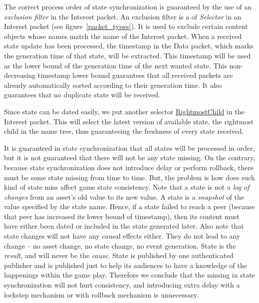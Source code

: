 \documentclass{sigchi}
\begin{document}
The correct process order of state synchronization is guaranteed by the use of an \emph{exclusion filter} in the Interest packet. An exclusion filter is a of \emph{Selector} in an Interest packet (see figure~\ref{packet_types}). It is used to exclude certain content objects whose names match the name of the Interest packet. When a received state update has been processed, the timestamp in the Data packet, which marks the generation time of that state, will be extracted. This timestamp will be used as the lower bound of the generation time of the next wanted state. This non-decreasing timestamp lower bound guarantees that all received packets are already automatically sorted according to their generation time. It also guarantees that no duplicate state will be received.

Since state can be dated easily, we put another selector \url{RightmostChild} in the Interest packet. This will select the latest version of available state, the rightmost child in the name tree, thus guaranteeing the freshness of every state received.

It is guaranteed in state synchronization that all states will be processed in order, but it is not guaranteed that there will not be any state missing. On the contrary, because state synchronization does not introduce delay or perform rollback, there must be some state missing from time to time. But, the problem is how does such kind of state miss affect game state consistency. Note that a state is not a \emph{log of changes} from an asset's old value to its new value. A state is a \emph{snapshot} of the value specified by the state name. Hence, if a state failed to reach a peer (because that peer has increased its lower bound of timestamp), then its content must have either been dated or included in the state generated later. Also note that state changes will not have any causal effects either. They do not lead to any change -- no asset change, no state change, no event generation. State is the \emph{result}, and will never be the \emph{cause}. State is published by one authenticated publisher and is published just to help its audiences to have a knowledge of the happenings within the game play. Therefore we conclude that the missing in state synchronization will not hurt consistency, and introducing extra delay with a lockstep mechanism or with rollback mechanism is unnecessary.
\end{document}
